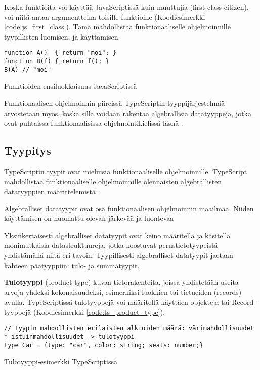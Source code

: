 Koska funktioita voi käyttää JavaScriptissä kuin muuttujia (first-class citizen), voi niitä antaa argumentteina toisille funktioille (Koodiesimerkki \ref{code:js_first_class}). Tämä mahdollistaa funktionaaliselle ohjelmoinnille tyypillisten  luomisen, ja käyttämisen.

\begin{code}
    \begin{verbatim}
function A()  { return "moi"; }
function B(f) { return f(); }
B(A) // "moi"
\end{verbatim}
    \caption{Funktioiden ensiluokkaisuus JavaScriptissä}
    \label{code:js_first_class}
\end{code}

Funktionaalisen ohjelmoinnin piireissä TypeScriptin tyyppijärjestelmää arvostetaan myös, koska sillä voidaan rakentaa algebrallisia datatyyppejä, jotka ovat puhtaissa funktionaalisissa ohjelmointikielissä läsnä \cite{holvikari2021category}.


\subsection{Tyypitys}

TypeScriptin tyypit ovat mieluisia funktionaaliselle ohjelmoinnille. TypeScript mahdollistaa funktionaaliselle ohjelmoinnille olennaisten algebrallisten datatyyppien määrittelemistä \cite{holvikari2021category}.

Algebralliset datatyypit ovat osa funktionaalisen ohjelmoinnin maailmaa. Niiden käyttämisen on huomattu olevan järkevää ja luontevaa \cite{holvikari2021category,hickey_maybe_not,algebraic_data_types}

Yksinkertaisesti algebralliset datatyypit ovat keino määritellä ja käsitellä monimutkaisia datastruktuureja, jotka koostuvat perustietotyypeistä yhdistämällä niitä eri tavoin. Tyypillisesti algebralliset datatyypit jaetaan kahteen päätyyppiin: tulo- ja summatyypit.

\textbf{Tulotyyppi} (product type) kuvaa tietorakenteita, joissa yhdistetään useita arvoja yhdeksi kokonaisuudeksi, esimerkiksi luokkien tai tietueiden (records) avulla.
TypeScriptissä tulotyyppejä voi määritellä käyttäen objekteja tai Record-tyyppejä (Koodiesimerkki \ref{code:ts_product_type}). \citep{algebraic_data_types,holvikari2021category}

\begin{code}
    \begin{verbatim}
// Tyypin mahdollisten erilaisten alkioiden määrä: värimahdollisuudet * istuinmahdollisuudet -> tulotyyppi
type Car = {type: "car", color: string; seats: number;}
\end{verbatim}
    \caption{Tulotyyppi-esimerkki TypeScriptissä}
    \label{code:ts_product_type}
\end{code}

